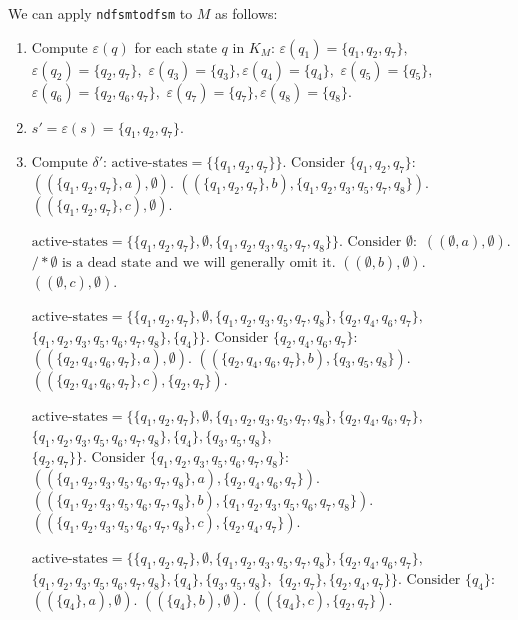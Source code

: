 \documentclass{article}
\begin{document}
We can apply \texttt{ndfsmtodfsm} to \( M \) as follows:
\begin{enumerate}
    \item Compute \( \varepsilon(q) \) for each state \( q \) in \( K_M \):
    $ \varepsilon(q_1) = \{q_1, q_2, q_7\}, $
    $ \varepsilon(q_2) = \{q_2, q_7\}, $
    $ \varepsilon(q_3) = \{q_3\}, \varepsilon(q_4) = \{q_4\}, $
    $ \varepsilon(q_5) = \{q_5\}, $
    $ \varepsilon(q_6) = \{q_2, q_6, q_7\}, $
    $ \varepsilon(q_7) = \{q_7\}, \varepsilon(q_8) = \{q_8\}. $

    \item \( s' = \varepsilon(s) = \{q_1, q_2, q_7\} \).

    \item Compute \( \delta' \):
    $ \text{active-states} = \{\{q_1, q_2, q_7\}\}. \text{ Consider } \{q_1, q_2, q_7\}: $
    $ ((\{q_1, q_2, q_7\}, a), \emptyset). $
    $ ((\{q_1, q_2, q_7\}, b), \{q_1, q_2, q_3, q_5, q_7, q_8\}). $
    $ ((\{q_1, q_2, q_7\}, c), \emptyset). $

    $ \text{active-states} = \{\{q_1, q_2, q_7\}, \emptyset, \{q_1, q_2, q_3, q_5, q_7, q_8\}\}. \text{ Consider } \emptyset: $
    $ ((\emptyset, a), \emptyset). $
    $ /* \emptyset \text{ is a dead state and we will generally omit it.} $
    $ ((\emptyset, b), \emptyset). $
    $ ((\emptyset, c), \emptyset). $

    $ \text{active-states} = \{\{q_1, q_2, q_7\}, \emptyset, \{q_1, q_2, q_3, q_5, q_7, q_8\}, \{q_2, q_4, q_6, q_7\}, $
    $ \{q_1, q_2, q_3, q_5, q_6, q_7, q_8\}, \{q_4\}\}. \text{ Consider } \{q_2, q_4, q_6, q_7\}: $
    $ ((\{q_2, q_4, q_6, q_7\}, a), \emptyset). $
    $ ((\{q_2, q_4, q_6, q_7\}, b), \{q_3, q_5, q_8\}). $
    $ ((\{q_2, q_4, q_6, q_7\}, c), \{q_2, q_7\}). $

    $ \text{active-states} = \{\{q_1, q_2, q_7\}, \emptyset, \{q_1, q_2, q_3, q_5, q_7, q_8\}, \{q_2, q_4, q_6, q_7\}, $
    $ \{q_1, q_2, q_3, q_5, q_6, q_7, q_8\}, \{q_4\}, \{q_3, q_5, q_8\}, $
    $ \{q_2, q_7\}\}. \text{ Consider } \{q_1, q_2, q_3, q_5, q_6, q_7, q_8\}: $
    $ ((\{q_1, q_2, q_3, q_5, q_6, q_7, q_8\}, a), \{q_2, q_4, q_6, q_7\}). $
    $ ((\{q_1, q_2, q_3, q_5, q_6, q_7, q_8\}, b), \{q_1, q_2, q_3, q_5, q_6, q_7, q_8\}). $
    $ ((\{q_1, q_2, q_3, q_5, q_6, q_7, q_8\}, c), \{q_2, q_4, q_7\}). $

    $ \text{active-states} = \{\{q_1, q_2, q_7\}, \emptyset, \{q_1, q_2, q_3, q_5, q_7, q_8\}, \{q_2, q_4, q_6, q_7\}, $
    $ \{q_1, q_2, q_3, q_5, q_6, q_7, q_8\}, \{q_4\}, \{q_3, q_5, q_8\}, $
    $ \{q_2, q_7\}, \{q_2, q_4, q_7\}\}. \text{ Consider } \{q_4\}: $
    $ ((\{q_4\}, a), \emptyset). $
    $ ((\{q_4\}, b), \emptyset). $
    $ ((\{q_4\}, c), \{q_2, q_7\}). $


\end{enumerate}
\end{document}
